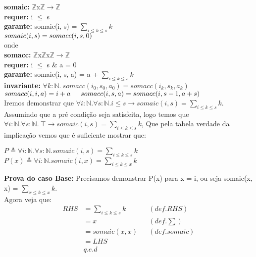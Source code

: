 \documentclass{article}
\begin{document}
\noindent \textbf{somaic:} $\mathbb{Z}$x$\mathbb{Z}$$ \rightarrow \mathbb{Z}$\\
\textbf{requer:} i $\leq$ s\\
\textbf{garante:} somaic(i, s) = $\sum\limits_{i \le k \le s} k$\\
$somaic(i, s) = somacc(i, s, 0)\\$
\\
onde\\
\indent \textbf{somacc:} $\mathbb{Z}$x$\mathbb{Z}$x$\mathbb{Z}$$ \rightarrow \mathbb{Z}$\\
\indent \textbf{requer:} i $\leq$ s \& a = 0\\
\indent \textbf{garante:} somaic(i, s, a) = a + $\sum\limits_{i \le k \le s} k$\\
\indent \textbf{invariante:} $\forall k:\mathbb{N}.\: somacc(i_0, s_0, a_0) = somacc(i_k, s_k, a_k)$\\
\indent $somacc(i, i, a) = i + a\\
\indent somacc(i, s, a) = somacc(i, s-1, a+s)\\$
\\
Iremos demonstrar que
$\forall i:\mathbb{N}. \forall s:\mathbb{N}. i \leq s\rightarrow somaic(i, s) = \sum\limits_{i \le k \le s} k$.
Assumindo que a pré condição seja satisfeita, logo temos que
$\forall i:\mathbb{N}. \forall s:\mathbb{N}.\: \top\rightarrow somaic(i, s) = \sum\limits_{i \le k \le s} k$,
Que pela tabela verdade da implicação vemos que é suficiente mostrar que:\\
\begin{center}
$P \triangleq \forall i:\mathbb{N}. \forall s:\mathbb{N}. somaic(i, s) = \sum\limits_{i \le k \le s} k$\\
$P(x) \triangleq \forall i:\mathbb{N}. somaic(i, x) = \sum\limits_{i \le k \le x} k$\\
\end{center}
\textbf{Prova do caso Base:} Precisamos demonstrar P(x) para x = i,
ou seja somaic(x, x) = $\sum\limits_{x \le k \le x} k$.\\
Agora veja que:
\begin{align*}
RHS &= \sum\limits_{i \le k \le s} k && (def. RHS)\\
&= x && (def. \sum)\\
&= somaic(x, x) && (def. somaic)\\
&= LHS \\
& q.e.d
\end{align*}
\end{document}
